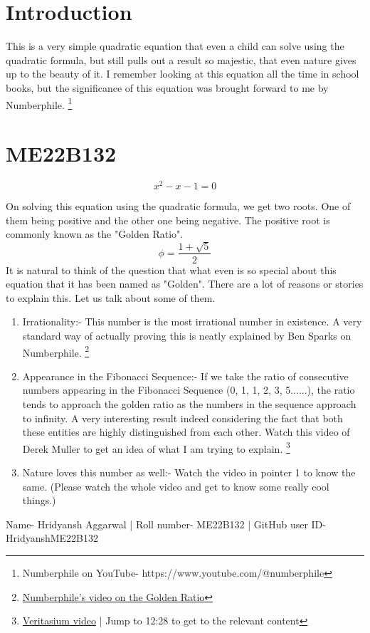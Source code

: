 \section{Introduction}

This is a very simple quadratic equation that even a child can solve using the quadratic formula, but still pulls out a result so majestic, that even nature gives up to the beauty of it. I remember looking at this equation all the time in school books, but the significance of this equation was brought forward to me by Numberphile. \footnote{Numberphile on YouTube- https://www.youtube.com/@numberphile}

\section{ME22B132}

\begin{equation}
    x^2-x-1=0
\end{equation}

On solving this equation using the quadratic formula, we get two roots. One of them being positive and the other one being negative. The positive root is commonly known as the "Golden Ratio".
\begin{equation}
    \phi = \frac{1+\sqrt{5}}{2}
\end{equation}
It is natural to think of the question that what even is so special about this equation that it has been named as "Golden".
There are a lot of reasons or stories to explain this. Let us talk about some of them.
\begin{enumerate}
    \item Irrationality:- This number is the most irrational number in existence. A very standard way of actually proving this is neatly explained by Ben Sparks on Numberphile. \footnote{\href{https://www.youtube.com/watch?v=sj8Sg8qnjOg}{Numberphile's video on the Golden Ratio}}
    \item Appearance in the Fibonacci Sequence:- If we take the ratio of consecutive numbers appearing in the Fibonacci Sequence (0, 1, 1, 2, 3, 5......), the ratio tends to approach the golden ratio as the numbers in the sequence approach to infinity. A very interesting result indeed considering the fact that both these entities are highly distinguished from each other. Watch this video of Derek Muller to get an idea of what I am trying to explain. \footnote{\href{https://www.youtube.com/watch?v=48sCx-wBs34}{Veritasium video} | Jump to 12:28 to get to the relevant content}
    \item Nature loves this number as well:- Watch the video in pointer 1 to know the same. (Please watch the whole video and get to know some really cool things.)
\end{enumerate}

Name- Hridyansh Aggarwal | Roll number- ME22B132 | GitHub user ID- HridyanshME22B132
